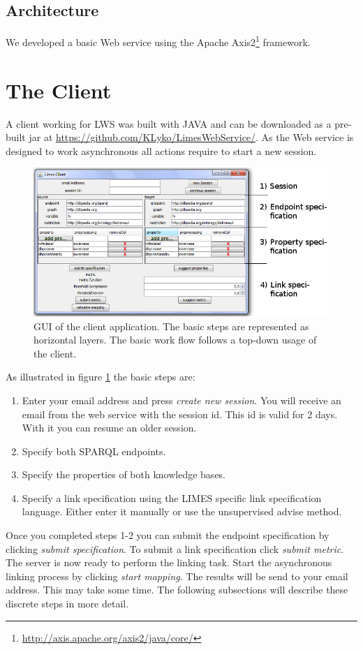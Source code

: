 \documentclass{article}
\begin{document}
\subsection{Architecture}
We developed a basic Web service using the Apache Axis2\footnote{\url{http://axis.apache.org/axis2/java/core/}} framework. 

\newpage
\section{The Client}
A client working for LWS was built with JAVA and can be downloaded as a pre-built jar at \url{https://github.com/KLyko/LimesWebService/}. As the Web service is designed to work asynchronous all actions require to start a new session.\\
\begin{figure}[h]
	\centering
		\includegraphics[width=7in]{images/Client_tasks.png}
	\caption{GUI of the client application. The basic steps are represented as horizontal layers. The basic work flow follows a top-down usage of the client.}
	\label{fig:client_tasks}
\end{figure}
As illustrated in figure \ref{fig:client_tasks} the basic steps are:
\begin{enumerate}
	\item Enter your email address and press \textit{create new session}. You will receive an email from the web service with the session id. This id is valid for 2 days. With it you can resume an older session.
	\item Specify both SPARQL endpoints.
	\item Specify the properties of both knowledge bases. 
	\item Specify a link specification using the LIMES specific link specification language. Either enter it manually or use the unsupervised advise method.
\end{enumerate}
Once you completed steps 1-2 you can submit the endpoint specification by clicking \textit{submit specification}. To submit a link specification click \textit{submit metric}. The server is now ready to perform the linking task. Start the asynchronous linking process by clicking \textit{start mapping}. The results will be send to your email address. This may take some time.
The following subsections will describe these discrete steps in more detail.
\end{document}
